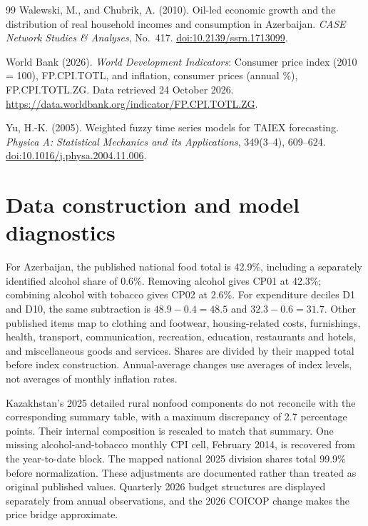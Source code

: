 \documentclass[11pt,a4paper]{article}
\begin{document}
\begin{thebibliography}{99}
Walewski, M., and Chubrik, A. (2010).
Oil-led economic growth and the distribution of real household incomes and consumption in Azerbaijan.
\emph{CASE Network Studies \& Analyses}, No.~417.
\href{https://doi.org/10.2139/ssrn.1713099}{doi:10.2139/ssrn.1713099}.

World Bank (2026). \emph{World Development Indicators}: Consumer price index (2010 = 100), FP.CPI.TOTL, and inflation, consumer prices (annual \%), FP.CPI.TOTL.ZG.
Data retrieved 24 October 2026.
\url{https://data.worldbank.org/indicator/FP.CPI.TOTL.ZG}.

Yu, H.-K. (2005). Weighted fuzzy time series models for TAIEX forecasting.
\emph{Physica A: Statistical Mechanics and its Applications}, 349(3--4), 609--624.
\href{https://doi.org/10.1016/j.physa.2004.11.006}{doi:10.1016/j.physa.2004.11.006}.
\end{thebibliography}

\clearpage
\appendix
\section{Data construction and model diagnostics}
\label{app:construction}

For Azerbaijan, the published national food total is 42.9\%, including a separately identified alcohol share of 0.6\%. Removing alcohol gives CP01 at 42.3\%; combining alcohol with tobacco gives CP02 at 2.6\%. For expenditure deciles D1 and D10, the same subtraction is $48.9-0.4=48.5$ and $32.3-0.6=31.7$. Other published items map to clothing and footwear, housing-related costs, furnishings, health, transport, communication, recreation, education, restaurants and hotels, and miscellaneous goods and services. Shares are divided by their mapped total before index construction. Annual-average changes use averages of index levels, not averages of monthly inflation rates.



Kazakhstan's 2025 detailed rural nonfood components do not reconcile with the corresponding summary table, with a maximum discrepancy of 2.7 percentage points. Their internal composition is rescaled to match that summary. One missing alcohol-and-tobacco monthly CPI cell, February 2014, is recovered from the year-to-date block. The mapped national 2025 division shares total 99.9\% before normalization. These adjustments are documented rather than treated as original published values. Quarterly 2026 budget structures are displayed separately from annual observations, and the 2026 COICOP change makes the price bridge approximate.
\end{document}
